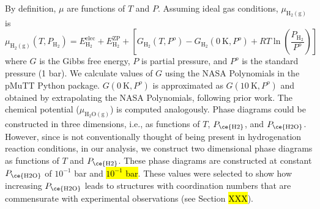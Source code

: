 By definition, $\mu$ are functions of $T$ and $P$. Assuming ideal gas conditions, $\mu_{\text{H}_2(\text{g})}$ is\cite{Reuter2003,Reuter2004,Grundner2015,Paolucci2016,Li2016,Getman2008,Mandal2020}   
\begin{equation}
    \mu_{\text{H}_{2}(\text{g})}(T,P_{\text{H}_{2}}) = E^\text{elec}_{\text{H}_{2}} + E^\text{ZP}_{\text{H}_{2}} + \left[ G_{\text{H}_{2}}(T,P^{o}) - G_{\text{H}_{2}}(0~\text{K},P^{o}) + RT \ln{\left( \frac{P_{\text{H}_{2}}}{P^{o}} \right)} \right] 
    \label{eq:chemicalpotentialrel}
\end{equation}
where $G$ is the Gibbs free energy, $P$ is partial pressure, and $P^{o}$ is the standard pressure (1 bar). We calculate values of $G$ using the NASA Polynomials\cite{Mcbride1993} in the pMuTT\cite{LYM2019106864} Python package. $G(0~\text{K},P^{o})$ is approximated as $G(10~\text{K},P^{o})$ and obtained by extrapolating the NASA Polynomials, following prior work.\cite{Getman2008,Li2016} The  chemical potential ($\mu_{\text{H}_2\text{O}(\text{g})}$) is computed analogously. Phase diagrams could be constructed in three dimensions, i.e., as functions of $T$, $P_{\text{\ce{H2}}}$, and $P_{\text{\ce{H2O}}}$. However, since  is not conventionally thought of being present in hydrogenation reaction conditions, in our analysis, we construct two dimensional phase diagrams as functions of $T$ and $P_{\text{\ce{H2}}}$. These phase diagrams are constructed at constant $P_{\text{\ce{H2O}}}$ of $10^{-1}$ bar and \hl{$10^{-1}$ bar}. These values were selected to show how increasing $P_{\text{\ce{H2O}}}$ leads to structures with  coordination numbers that are commensurate with experimental observations (see Section \hl{XXX}).






